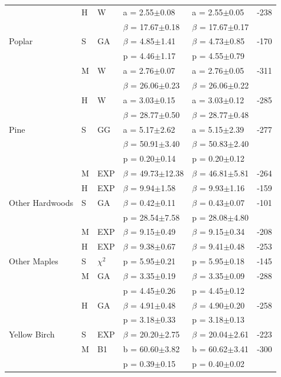 \documentclass{article}
\begin{document}
\begin{table}
{\begin{tabular}{lllllr}
 & H & W & a = 2.55$\pm$0.08 & a = 2.55$\pm$0.05 & -238 \\
 &  &  & $\beta$ = 17.67$\pm$0.18 & $\beta$ = 17.67$\pm$0.17 &  \\
Poplar & S & GA & $\beta$ = 4.85$\pm$1.41 & $\beta$ = 4.73$\pm$0.85 & -170 \\
 &  &  & p = 4.46$\pm$1.17 & p = 4.55$\pm$0.79 &  \\
 & M & W & a = 2.76$\pm$0.07 & a = 2.76$\pm$0.05 & -311 \\
 &  &  & $\beta$ = 26.06$\pm$0.23 & $\beta$ = 26.06$\pm$0.22 &  \\
 & H & W & a = 3.03$\pm$0.15 & a = 3.03$\pm$0.12 & -285 \\
 &  &  & $\beta$ = 28.77$\pm$0.50 & $\beta$ = 28.77$\pm$0.48 &  \\Pine & S & GG & a = 5.17$\pm$2.62 & a = 5.15$\pm$2.39 & -277 \\
 &  &  & $\beta$ = 50.91$\pm$3.40 & $\beta$ = 50.83$\pm$2.40 &  \\
 &  &  & p = 0.20$\pm$0.14 & p = 0.20$\pm$0.12 &  \\
 & M & EXP & $\beta$ = 49.73$\pm$12.38 & $\beta$ = 46.81$\pm$5.81 & -264 \\
 & H & EXP & $\beta$ = 9.94$\pm$1.58 & $\beta$ = 9.93$\pm$1.16 & -159 \\
Other Hardwoods & S & GA & $\beta$ = 0.42$\pm$0.11 & $\beta$ = 0.43$\pm$0.07 & -101 \\
 &  &  & p = 28.54$\pm$7.58 & p = 28.08$\pm$4.80 &  \\
 & M & EXP & $\beta$ = 9.15$\pm$0.49 & $\beta$ = 9.15$\pm$0.34 & -208 \\
 & H & EXP & $\beta$ = 9.38$\pm$0.67 & $\beta$ = 9.41$\pm$0.48 & -253 \\
Other Maples & S & $\chi^2$ & p = 5.95$\pm$0.21 & p = 5.95$\pm$0.18 & -145 \\
 & M & GA & $\beta$ = 3.35$\pm$0.19 & $\beta$ = 3.35$\pm$0.09 & -288 \\
 &  &  & p = 4.45$\pm$0.26 & p = 4.45$\pm$0.12 &  \\
 & H & GA & $\beta$ = 4.91$\pm$0.48 & $\beta$ = 4.90$\pm$0.20 & -258 \\
 &  &  & p = 3.18$\pm$0.33 & p = 3.18$\pm$0.13 &  \\
Yellow Birch & S & EXP & $\beta$ = 20.20$\pm$2.75 & $\beta$ = 20.04$\pm$2.61 & -223 \\
 & M & B1 & b = 60.60$\pm$3.82 & b = 60.62$\pm$3.41 & -300 \\
 &  &  & p = 0.39$\pm$0.15 & p = 0.40$\pm$0.02 &  \\

\end{tabular}}
\end{table}
\end{document}
